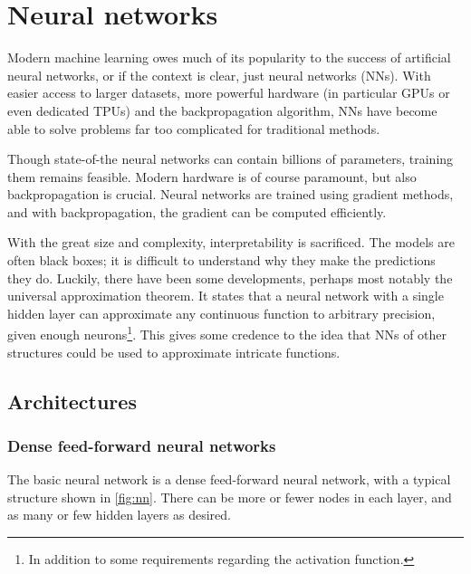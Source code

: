 \section{Neural networks}
Modern machine learning owes much of its popularity to the success of artificial neural networks, or if the context is clear, just neural networks (NNs).
With easier access to larger datasets, more powerful hardware (in particular GPUs or even dedicated TPUs) and the backpropagation algorithm, NNs have become able to solve problems far too complicated for traditional methods.

Though state-of-the neural networks can contain billions of parameters, training them remains feasible.
Modern hardware is of course paramount, but also backpropagation is crucial.
Neural networks are trained using gradient methods, and with backpropagation, the gradient can be computed efficiently.

With the great size and complexity, interpretability is sacrificed.
The models are often black boxes; it is difficult to understand why they make the predictions they do.
Luckily, there have been some developments, perhaps most notably the universal approximation theorem.
It states that a neural network with a single hidden layer can approximate any continuous function to arbitrary precision, given enough neurons\footnote{In addition to some requirements regarding the activation function.}.
This gives some credence to the idea that NNs of other structures could be used to approximate intricate functions.


\subsection{Architectures}
\subsubsection{Dense feed-forward neural networks}
The basic neural network is a dense feed-forward neural network, with a typical structure shown in \cref{fig:nn}.
There can be more or fewer nodes in each layer, and as many or few hidden layers as desired.


